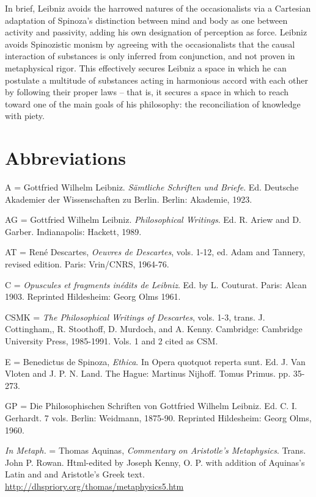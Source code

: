 \documentclass{article}
\begin{document}
In brief, Leibniz avoids the harrowed natures of the occasionalists via
a Cartesian adaptation of Spinoza's distinction between mind and body as
one between activity and passivity, adding his own designation of
perception as force. Leibniz avoids Spinozistic monism by agreeing with
the occasionalists that the causal interaction of substances is only
inferred from conjunction, and not proven in metaphysical rigor. This
effectively secures Leibniz a space in which he can postulate a
multitude of substances acting in harmonious accord with each other by
following their proper laws -- that is, it secures a space in which to
reach toward one of the main goals of his philosophy: the reconciliation
of knowledge with piety.

\section{Abbreviations}

A = Gottfried Wilhelm Leibniz. \emph{Sämtliche Schriften und Briefe}.
Ed. Deutsche Akademier der Wissenschaften zu Berlin. Berlin: Akademie,
1923.

AG = Gottfried Wilhelm Leibniz. \emph{Philosophical Writings}. Ed. R.
Ariew and D. Garber. Indianapolis: Hackett, 1989.

AT = René Descartes, \emph{Oeuvres de Descartes}, vols. 1-12, ed. Adam
and Tannery, revised edition. Paris: Vrin/CNRS, 1964-76.

C = \emph{Opuscules et fragments inédits de Leibniz}. Ed. by L.
Couturat. Paris: Alcan 1903. Reprinted Hildesheim: Georg Olms 1961.

CSMK = \emph{The Philosophical Writings of Descartes}, vols. 1-3, trans.
J. Cottingham,, R. Stoothoff, D. Murdoch, and A. Kenny. Cambridge:
Cambridge University Press, 1985-1991. Vols. 1 and 2 cited as CSM.

E = Benedictus de Spinoza, \emph{Ethica}. In Opera quotquot reperta
sunt. Ed. J. Van Vloten and J. P. N. Land. The Hague: Martinus Nijhoff.
Tomus Primus. pp. 35-273.

GP = Die Philosophischen Schriften von Gottfried Wilhelm Leibniz. Ed. C.
I. Gerhardt. 7 vols. Berlin: Weidmann, 1875-90. Reprinted Hildesheim:
Georg Olms, 1960.

\emph{In Metaph.} = Thomas Aquinas, \emph{Commentary on Aristotle's
Metaphysics}. Trans. John P. Rowan. Html-edited by Joseph Kenny, O. P.
with addition of Aquinas's Latin and and Aristotle's Greek text.
\url{http://dhspriory.org/thomas/metaphysics5.htm}
\end{document}
